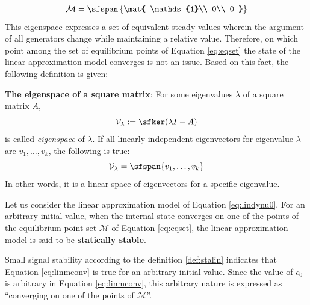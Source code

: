 \documentclass[graybox, envcountchap]{svmult}
\begin{document}
\begin{align}\label{eq:eqset}
\mathcal{M} =
 \sfspan\left\{
 \mat{
 \mathds{1}\\
 0\\
 0
 }
 \right\}
\end{align}
This eigenspace expresses a set of equivalent steady values wherein the argument of all generators change while maintaining a relative value.
Therefore, on which point among the set of equilibrium points of Equation \ref{eq:eqset} the state of the linear approximation model converges is not an issue.
Based on this fact, the following definition is given:

\begin{COLUMN}
\noindent \textbf{The eigenspace of a square matrix}:
For some eigenvalues $\lambda$ of a square matrix $A$,
\[
\mathcal{V}_{\lambda}:= \sfker (\lambda I -A)
\]
is called \emph{eigenspace} of $\lambda$. If all linearly independent
eigenvectors for eigenvalue $\lambda$ are $v_1,\ldots,v_k$, the following is
true:
\[
\mathcal{V}_{\lambda} = \sfspan\{v_1,\ldots,v_k\}
\]
In other words, it is a linear space of eigenvectors for a specific eigenvalue.
\end{COLUMN}


\begin{definition}
\label{def:stalin}
Let us consider the linear approximation model of Equation \ref{eq:lindynu0}.
For an arbitrary initial value, when the internal state converges on one of the points of the equilibrium point set $\mathcal{M}$ of Equation \ref{eq:eqset}, the linear approximation model is said to be \textbf{statically stable}.
\end{definition}
Small signal stability according to the definition \ref{def:stalin} indicates that Equation \ref{eq:linmconv} is true for an arbitrary initial value.
Since the value of $c_0$ is arbitrary in Equation \ref{eq:linmconv}, this arbitrary nature is expressed as “converging on one of the points of $\mathcal{M}$”.
\end{document}
